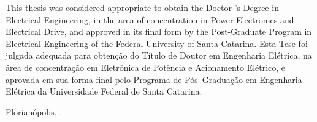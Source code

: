 


\begin{folhadeaprovacao}

    \begin{center}
        {\ABNTEXchapterfont\large\imprimirautor}

        \begin{center}
            \ABNTEXchapterfont\bfseries\Large\imprimirtitulo
        \end{center}

        \begin{minipage}{\textwidth}
            \chooselang
            {
                This thesis was considered appropriate to obtain the Doctor 's Degree in Electrical Engineering, in the area of concentration in Power Electronics and Electrical Drive, and approved in its final form by the Post-Graduate Program in Electrical Engineering of the Federal University of Santa Catarina.
            }
            {
                Esta Tese foi julgada adequada para obtenção do Título de Doutor em Engenharia Elétrica, na área de concentração em Eletrônica de Potência e Acionamento Elétrico, e aprovada em sua forma final pelo Programa de Pós--Graduação em Engenharia Elétrica da Universidade Federal de Santa Catarina.
            }
        \end{minipage}%

    \end{center}
    \begin{center}
        Florianópolis, \imprimirdata.
    \end{center}


    \assinatura{\textbf{\imprimirorientador} \\ \imprimirorientadorRotulo \\
    \imprimirinstituicao~--~\imprimirinstituicaosigla}

    \assinatura{\textbf{\imprimircoorientador} \\ \imprimircoorientadorRotulo \\
    \imprimirinstituicao~--~\imprimirinstituicaosigla}

    \newpage
    \begin{flushleft}
        \textbf{}
    \end{flushleft}


\end{folhadeaprovacao}
